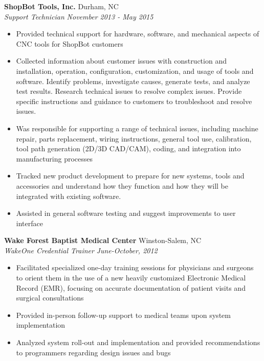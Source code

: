 \documentclass[11pt]{article}
\begin{document}
\noindent
{\bf ShopBot Tools, Inc.} \hfill Durham, NC\\
{\it Support Technician} \hfill {\it November 2013 - May 2015}

\begin{itemize}
\setlength{\itemsep}{1pt}

\item Provided technical support for hardware, software, and mechanical
aspects of CNC tools for ShopBot customers

\item Collected information about customer issues with construction and
installation, operation, configuration, customization, and usage of tools
and software. Identify problems, investigate causes, generate tests,
and analyze test results. Research technical issues to resolve complex
issues. Provide specific instructions and guidance to customers to
troubleshoot and resolve issues.

\item Was responsible for supporting a range of technical issues, including
machine repair, parts replacement, wiring instructions, general tool use,
calibration, tool path generation (2D/3D CAD/CAM), coding, and integration
into manufacturing processes

\item Tracked new product development to prepare for new systems, tools and
accessories and understand how they function and how they will be integrated
  with existing software.
\item Assisted in general software testing and suggest improvements to user
interface

\end{itemize}
\vspace{10pt}

\noindent
{\bf Wake Forest Baptist Medical Center} \hfill Winston-Salem, NC\\
{\it WakeOne Credential Trainer} \hfill {\it June-October, 2012}

\begin{itemize}
\setlength{\itemsep}{1pt}

\item Facilitated specialized one-day training sessions for physicians
and surgeons to orient them in the use of a new heavily customized Electronic
Medical Record (EMR), focusing on accurate documentation of patient visits
and surgical consultations

\item Provided in-person follow-up support to medical teams upon system
implementation

\item Analyzed system roll-out and implementation and provided
recommendations to programmers regarding design issues and bugs

\end{itemize}
\vspace{1pt}
\end{document}

